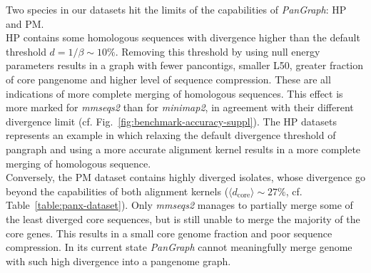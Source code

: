 \documentclass[aps,rmp,reprint,superscriptaddress,notitlepage,10pt,onecolumn]{revtex4-1}
\newcommand{\dcore}{\langle d_\text{core} \rangle}
\begin{document}
Two species in our datasets hit the limits of the capabilities of \textit{PanGraph}: HP and PM.\\
HP contains some homologous sequences with divergence higher than the default threshold $d = 1/\beta \sim 10\%$. Removing this threshold by using null energy parameters results in a graph with fewer pancontigs, smaller L50, greater fraction of core pangenome and higher level of sequence compression. These are all indications of more complete merging of homologous sequences. This effect is more marked for \textit{mmseqs2} than for \textit{minimap2}, in agreement with their different divergence limit (cf. Fig.~\ref{fig:benchmark-accuracy-suppl}). The HP datasets represents an example in which relaxing the default divergence threshold of pangraph and using a more accurate alignment kernel results in a more complete merging of homologous sequence.\\
Conversely, the PM dataset contains highly diverged isolates, whose divergence go beyond the capabilities of both alignment kernels ($\dcore \sim 27 \%$, cf. Table~\ref{table:panx-dataset}). Only \textit{mmseqs2} manages to partially merge some of the least diverged core sequences, but is still unable to merge the majority of the core genes. This results in a small core genome fraction and poor sequence compression. In its current state \textit{PanGraph} cannot meaningfully merge genome with such high divergence into a pangenome graph.
\end{document}
